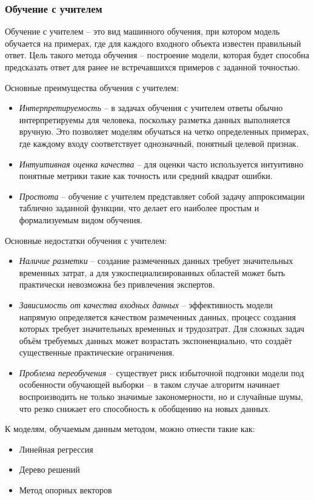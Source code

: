 \documentclass[../part_1.tex]{subfiles}
\begin{document}
\subsubsection{Обучение с учителем}
    \label{sec:with_teacher}
    \par Обучение с учителем -- это вид машинного обучения, при котором модель обучается на примерах, где для каждого входного объекта известен правильный ответ. Цель такого метода обучения -- построение модели, которая будет способна предсказать ответ для ранее не встречавшихся примеров с заданной точностью.
    \par Основные преимущества обучения с учителем:
    \begin{itemize}
        \item \textit{Интерпретируемость} -- в задачах обучения с учителем ответы обычно интерпретируемы для человека, поскольку разметка данных выполняется вручную. Это позволяет моделям обучаться на четко определенных примерах, где каждому входу соответствует однозначный, понятный целевой признак.
        \item \textit{Интуитивная оценка качества} -- для оценки часто используется интуитивно понятные метрики такие как точность или средний квадрат ошибки. 
        \item \textit{Простота} -- обучение с учителем представляет собой задачу аппроксимации таблично заданной функции, что делает его наиболее простым и формализуемым видом обучения.
    \end{itemize}
    \par Основные недостатки обучения с учителем:
    \begin{itemize}
        \item \textit{Наличие разметки} -- создание размеченных данных требует значительных временных затрат, а для узкоспециализированных областей может быть практически невозможна без привлечения экспертов.
        \item \textit{Зависимость от качества входных данных} -- эффективность модели напрямую определяется качеством размеченных данных, процесс создания которых требует значительных временных и трудозатрат. Для сложных задач объём требуемых данных может возрастать экспоненциально, что создаёт существенные практические ограничения.
        \item \textit{Проблема переобучения} -- существует риск избыточной подгонки модели под особенности обучающей выборки -- в таком случае алгоритм начинает воспроизводить не только значимые закономерности, но и случайные шумы, что резко снижает его способность к обобщению на новых данных.
    \end{itemize}
    \par К моделям, обучаемым данным методом, можно отнести такие как:
    \begin{itemize}
        \item Линейная регрессия\cite{linearregression}
        \item Дерево решений\cite{dessisiontree}
        \item Метод опорных векторов\cite{svm}
    \end{itemize}
    
\end{document}
